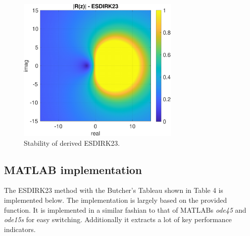 \begin{figure}[h]
    \centering
    \includegraphics[width=0.7\textwidth]{plots/7_2a.pdf}
    \caption{Stability of derived ESDIRK23.}
    \label{fig:7_2}
\end{figure}

\subsection{MATLAB implementation}
The ESDIRK23 method with the Butcher's Tableau shown in Table 4 is implemented below. The implementation is largely based on the provided function. It is implemented in a similar fashian to that of MATLABs \textit{ode45} and \textit{ode15s} for easy switching. Additionally it extracts a lot of key performance indicators.

